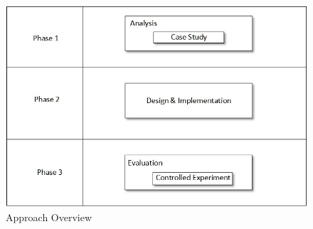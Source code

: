 \begin{figure}
	\includegraphics[width=1\textwidth]{figures/Approach_Overview}
	\caption{Approach Overview}
	\label{fig:Approach_Overview}
\end{figure}

